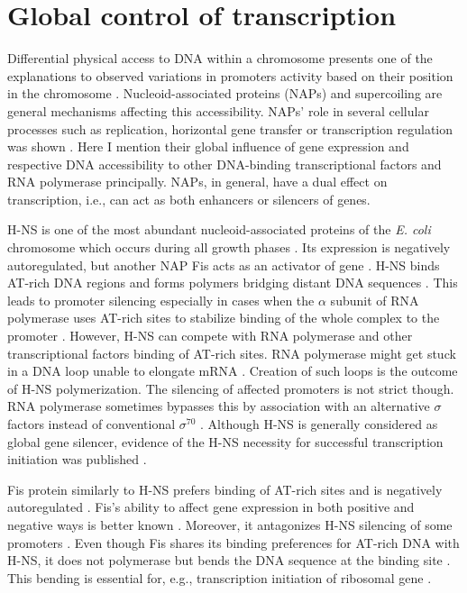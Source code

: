 \section{Global control of transcription}
Differential physical access to DNA within a chromosome presents one of the explanations to observed variations in promoters activity based on their position in the chromosome \cite{bryant2014chromosome}.
Nucleoid-associated proteins (NAPs) and supercoiling are general mechanisms affecting this accessibility.
NAPs' role in several cellular processes such as replication, horizontal gene transfer or transcription regulation was shown \cite{dixon1984protein, kayoko1992histone, aznar2013hha}.
Here I mention their global influence of gene expression and respective DNA accessibility to other DNA-binding transcriptional factors and RNA polymerase principally.
NAPs, in general, have a dual effect on transcription, i.e., can act as both enhancers or silencers of genes.

H-NS is one of the most abundant nucleoid-associated proteins of the \textit{E. coli} chromosome which occurs during all growth phases \cite{azam1999growth}.
Its expression is negatively autoregulated, but another NAP Fis acts as an activator of  gene \cite{ueguchi1993autoregulatory, falconi1996antagonistic}.
H-NS binds AT-rich DNA regions and forms polymers bridging distant DNA sequences  \cite{navarre2006selective, arold2010h}.
This leads to promoter silencing especially in cases when the $\alpha$ subunit of RNA polymerase uses AT-rich sites to stabilize binding of the whole complex to the promoter \cite{singh2013h}.
However, H-NS can compete with RNA polymerase and other transcriptional factors binding of AT-rich sites.
RNA polymerase might get stuck in a DNA loop unable to elongate mRNA \cite{dame2002structural}.
Creation of such loops is the outcome of H-NS polymerization.
The silencing of affected promoters is not strict though.
RNA polymerase sometimes bypasses this by association with an alternative $\sigma$ factors instead of conventional $\sigma^{70}$ \cite{grainger2008selective}.
Although H-NS is generally considered as global gene silencer, evidence of the H-NS necessity for successful transcription initiation was published \cite{singh2013h}.

Fis protein similarly to H-NS prefers binding of AT-rich sites and is negatively autoregulated \cite{ball1992dramatic, stella2010shape}.
Fis's ability to affect gene expression in both positive and negative ways is better known \cite{choi2005effects, karambelkar2012silencing}.
Moreover, it antagonizes H-NS silencing of some promoters \cite{falconi2001involvement}.
Even though Fis shares its binding preferences for AT-rich DNA with H-NS, it does not polymerase but bends the DNA sequence at the binding site \cite{hubner1989bent}.
This bending is essential for, e.g., transcription initiation of ribosomal gene  \cite{gosink1993dna}.

